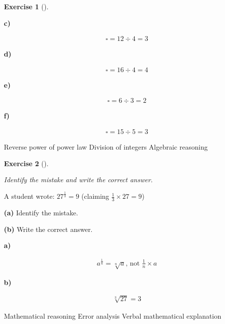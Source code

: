 \documentclass[
  letterpaper,
  DIV=11,
  numbers=noendperiod]{scrreprt}
\theoremstyle{definition}
\newtheorem{exercise}{Exercise}[chapter]
\theoremstyle{remark}
\begin{document}
\begin{exercise}[]
\begin{tcolorbox}
\textbf{c)}

\[
\begin{aligned}
\square = 12 \div 4 = 3
\end{aligned}
\]

\textbf{d)}

\[
\begin{aligned}
\square = 16 \div 4 = 4
\end{aligned}
\]

\textbf{e)}

\[
\begin{aligned}
\square = 6 \div 3 = 2
\end{aligned}
\]

\textbf{f)}

\[
\begin{aligned}
\square = 15 \div 5 = 3
\end{aligned}
\]

\end{tcolorbox}

{Reverse power of power law} {Division of integers} {Algebraic
reasoning}

\end{exercise}

\begin{exercise}[]\protect\hypertarget{exr-u2-30}{}\label{exr-u2-30}

\emph{Identify the mistake and write the correct answer.}

A student wrote: \(27^{\frac{1}{3}} = 9\) (claiming
\(\frac{1}{3}\times27=9\))

\textbf{(a)} Identify the mistake.

\textbf{(b)} Write the correct answer.

\begin{tcolorbox}[enhanced jigsaw, opacitybacktitle=0.6, coltitle=black, arc=.35mm, colframe=quarto-callout-tip-color-frame, colback=white, bottomrule=.15mm, left=2mm, colbacktitle=quarto-callout-tip-color!10!white, titlerule=0mm, opacityback=0, title=\textcolor{quarto-callout-tip-color}{\faLightbulb}\hspace{0.5em}{🔍 View Solution}, leftrule=.75mm, breakable, rightrule=.15mm, bottomtitle=1mm, toptitle=1mm, toprule=.15mm]

\textbf{a)}

\[
\begin{aligned}
a^{\frac{1}{n}}=\sqrt[n]{a}\text{, not }\frac{1}{n}\times a
\end{aligned}
\]

\textbf{b)}

\[
\begin{aligned}
\sqrt[3]{27}=3
\end{aligned}
\]

\end{tcolorbox}

{Mathematical reasoning} {Error analysis} {Verbal mathematical
explanation}

\end{exercise}
\end{document}
